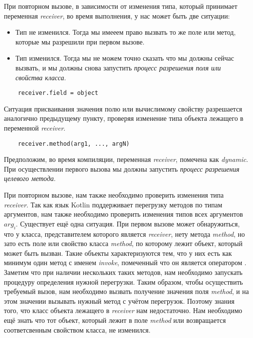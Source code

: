 При повторном вызове, в зависимости от изменения типа, который принимает переменная \textit{receiver}, во время выполнения, у нас может быть две ситуации:

\begin{itemize}
    \item Тип не изменился. Тогда мы имееем право вызвать то же поле или метод, которые мы разрешили при первом вызове.
    \item Тип изменился. Тогда мы не можем точно сказать что мы должны сейчас вызвать, и мы должны снова запустить \textit{процесс разрешения поля или свойства класса}.
\end{itemize}

\begin{verbatim}
    receiver.field = object
\end{verbatim}

Ситуация присваивания значения полю или вычислимому свойству разрешается аналогично предыдущему пункту, проверяя изменение типа объекта лежащего в переменной \textit{receiver}.

\begin{verbatim}
    receiver.method(arg1, ..., argN)
\end{verbatim}

Предположим, во время компиляции, переменная \textit{receiver}, помечена как \textit{dynamic}. При осуществлении первого
вызова мы должны запустить \textit{процесс разрешения целевого метода}.

При повторном вызове, нам также необходимо проверить изменения типа  \textit{receiver}. Так как язык Kotlin поддерживает перегрузку методов по типам аргументов, нам также необходимо проверить изменения типов всех аргументов $arg_i$. Существует ещё одна ситуация. При первом вызове может обнаружиться, что у класса, представителем которого является \textit{receiver}, нету метода \textit{method}, но зато есть поле или свойство класса \textit{method}, по которому лежит объект, который может быть вызван. Такие объекты характеризуются тем, что у них есть как минимум один метод с именем \textit{invoke}, помеченный что он является оператором \cite{book:jemerov2017kotlininAction}. Заметим что при наличии нескольких таких методов, нам необходимо запускать процедуру определения нужной перегрузки. Таким образом, чтобы осуществить требуемый вызов, нам необходимо вызвать получение значения поля \textit{method}, и на этом значении вызывать нужный метод с учётом перегрузок. Поэтому знания того, что класс объекта лежащего в \textit{receiver} нам недостаточно. Нам необходимо ещё знать что тот объект, который лежит в поле \textit{method} или возвращается соответсвенным свойством класса, не изменился.



